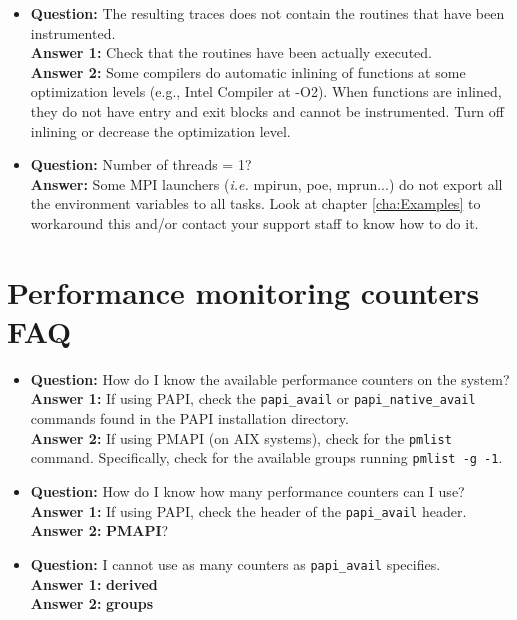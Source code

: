 \begin{itemize}
\item {\bf Question:} The resulting traces does not contain the routines that have been instrumented.\\
      {\bf Answer 1:} Check that the routines have been actually executed.\\
      {\bf Answer 2:} Some compilers do automatic inlining of functions at some optimization levels (e.g., Intel Compiler at -O2). When functions are inlined, they do not have entry and exit blocks and cannot be instrumented. Turn off inlining or decrease the optimization level.

\item {\bf Question:} Number of threads = 1?\\
      {\bf Answer:} Some MPI launchers ({\it i.e.} mpirun, poe, mprun...) do not export all the environment variables to all tasks. Look at chapter \ref{cha:Examples} to workaround this and/or contact your support staff to know how to do it.

\end{itemize}

\section{Performance monitoring counters FAQ}

\begin{itemize}

\item {\bf Question:} How do I know the available performance counters on the system?\\
      {\bf Answer 1:} If using PAPI, check the {\tt papi\_avail} or {\tt papi\_native\_avail} commands found in the PAPI installation directory.\\
      {\bf Answer 2:} If using PMAPI (on AIX systems), check for the {\tt pmlist} command. Specifically, check for the available groups running {\tt pmlist -g -1}.

\item {\bf Question:} How do I know how many performance counters can I use?\\
      {\bf Answer 1:} If using PAPI, check the header of the {\tt papi\_avail} header.\\
      {\bf Answer 2:} {\bf PMAPI}?

\item {\bf Question:} I cannot use as many counters as {\tt papi\_avail} specifies.\\
      {\bf Answer 1:} {\bf derived}\\
			{\bf Answer 2:} {\bf groups}


\end{itemize}

